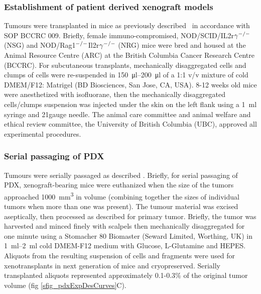 \documentclass{article}
\begin{document}
\subsubsection{Establishment of patient derived xenograft models}
Tumours were transplanted in mice as previously described~\cite{eirew2015dynamics} in accordance with SOP BCCRC 009. 
Briefly, female immuno-compromised, NOD/SCID/IL2r$\gamma^{\small{-/-}}$ (NSG) and NOD/Rag1$^{\small{-/-}}$Il2r$\gamma ^{\small{-/-}}$ (NRG)\cite{pearson2008non} mice were bred and housed at the Animal Resource Centre (ARC) at the British Columbia Cancer Research Centre (BCCRC). 
For subcutaneous transplants, mechanically disaggregated cells and clumps of cells were re-suspended in \SIrange{150}{200}{\ul} of a 1:1 v/v mixture of cold DMEM/F12: Matrigel (BD Biosciences, San Jose, CA, USA).
8-12 weeks old mice were anesthetized with isofluorane, then the mechanically disaggregated cells/clumps suspension was injected under the skin on the left flank using a \SI{1}{\ml} syringe and 21gauge needle. 
The animal care committee and animal welfare and ethical review committee, the University of British Columbia (UBC), approved all experimental procedures.

\subsubsection{Serial passaging of PDX}
Tumours were serially passaged as  described \cite{eirew2015dynamics}.
Briefly, for serial passaging of PDX, xenograft-bearing mice were euthanized when the size of the tumors approached \SI{1000}{\mm\cubed} in volume (combining together the sizes of individual tumors when more than one was present).
The tumour material was excised aseptically, then processed as described for primary tumor. 
Briefly, the tumor was harvested and minced finely with scalpels then mechanically disaggregated for one minute using a Stomacher 80 Biomaster (Seward Limited, Worthing, UK) in \SIrange{1}{2}{\ml} cold DMEM-F12 medium with Glucose, L-Glutamine and HEPES. 
Aliquots from the resulting suspension of cells and fragments were used for xenotransplants in next generation of mice and cryopreserved.
Serially transplanted aliquots represented approximately 0.1-0.3\%  of the original tumor volume (fig \ref{sfig_pdxExpDesCurves}C).
 
\end{document}
